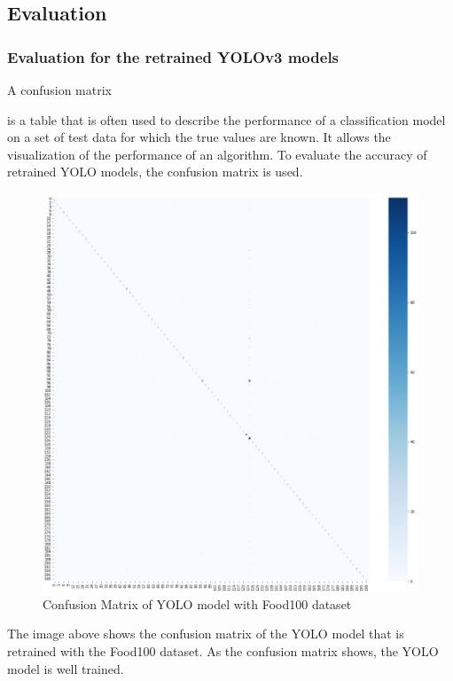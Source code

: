 \documentclass{article}
\begin{document}
\subsection{Evaluation}

\subsubsection{Evaluation for the retrained YOLOv3 models}

\hypertarget{evaluate_yolo_with_cm}{A confusion matrix} is a table that is often used to describe the performance of a classification model on a set of test data for which the true values are known. It allows the visualization of the performance of an algorithm. To evaluate the accuracy of retrained YOLO models, the confusion matrix is used.

\begin{figure}[H]
    \centering
    \includegraphics[scale=0.6]{imgs/cm_food100.png}
    \caption{Confusion Matrix of YOLO model with Food100 dataset}
    \label{fig:cm_food100}
\end{figure}

The image above shows the confusion matrix of the YOLO model that is retrained with the Food100 dataset. As the confusion matrix shows, the YOLO model is well trained.
\end{document}
